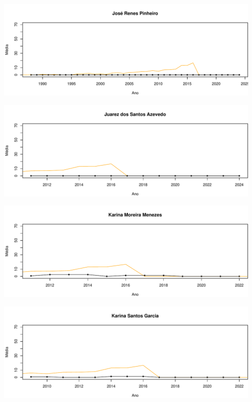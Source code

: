 \documentclass[12pt,brazil]{article}\usepackage[]{graphicx}\usepackage[]{xcolor}
\makeatletter
\def\maxwidth{ %
  \ifdim\Gin@nat@width>\linewidth
    \linewidth
  \else
    \Gin@nat@width
  \fi
}
\makeatother
\begin{document}
\vspace{0.5cm}


{\centering \includegraphics[width=\maxwidth]{figure/mediamovel-35} 

}



\vspace{0.5cm}


{\centering \includegraphics[width=\maxwidth]{figure/mediamovel-36} 

}



\vspace{0.5cm}


{\centering \includegraphics[width=\maxwidth]{figure/mediamovel-37} 

}



\vspace{0.5cm}


{\centering \includegraphics[width=\maxwidth]{figure/mediamovel-38} 

}
\end{document}
